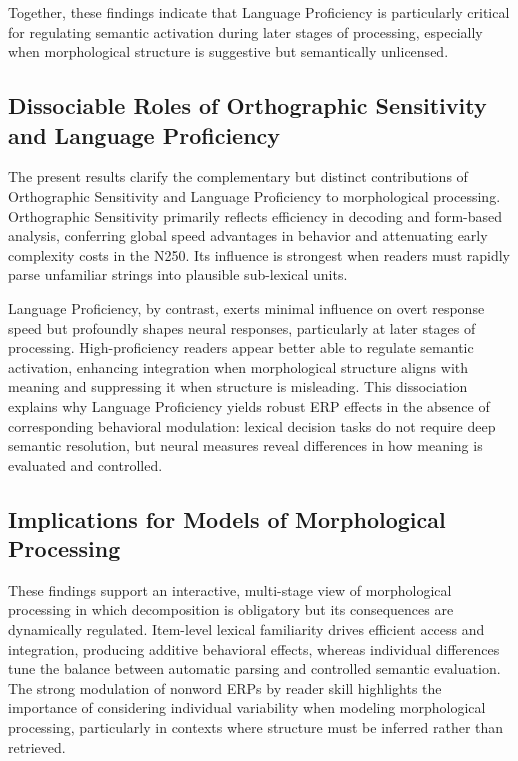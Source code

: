 \documentclass[utf8]{FrontiersinHarvard} %
\begin{document}
Together, these findings indicate that Language Proficiency is particularly critical for regulating semantic activation during later stages of processing, especially when morphological structure is suggestive but semantically unlicensed.

\subsection{Dissociable Roles of Orthographic Sensitivity and Language Proficiency}

The present results clarify the complementary but distinct contributions of Orthographic Sensitivity and Language Proficiency to morphological processing. Orthographic Sensitivity primarily reflects efficiency in decoding and form-based analysis, conferring global speed advantages in behavior and attenuating early complexity costs in the N250. Its influence is strongest when readers must rapidly parse unfamiliar strings into plausible sub-lexical units.

Language Proficiency, by contrast, exerts minimal influence on overt response speed but profoundly shapes neural responses, particularly at later stages of processing. High-proficiency readers appear better able to regulate semantic activation, enhancing integration when morphological structure aligns with meaning and suppressing it when structure is misleading. This dissociation explains why Language Proficiency yields robust ERP effects in the absence of corresponding behavioral modulation: lexical decision tasks do not require deep semantic resolution, but neural measures reveal differences in how meaning is evaluated and controlled.

\subsection{Implications for Models of Morphological Processing}

These findings support an interactive, multi-stage view of morphological processing in which decomposition is obligatory but its consequences are dynamically regulated. Item-level lexical familiarity drives efficient access and integration, producing additive behavioral effects, whereas individual differences tune the balance between automatic parsing and controlled semantic evaluation. The strong modulation of nonword ERPs by reader skill highlights the importance of considering individual variability when modeling morphological processing, particularly in contexts where structure must be inferred rather than retrieved.
\end{document}
